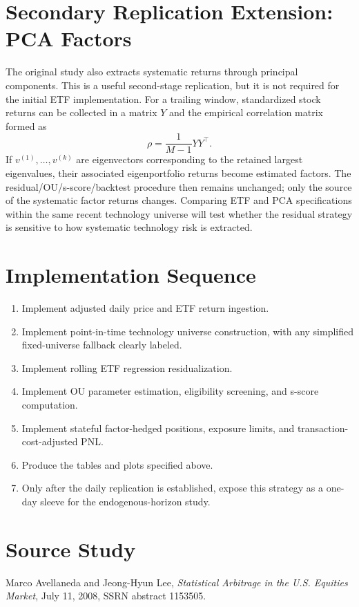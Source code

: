 \documentclass[11pt]{article}
\begin{document}
\section{Secondary Replication Extension: PCA Factors}

The original study also extracts systematic returns through principal
components. This is a useful second-stage replication, but it is not required
for the initial ETF implementation. For a trailing window, standardized stock
returns can be collected in a matrix $Y$ and the empirical correlation matrix
formed as
\[
    \rho = \frac{1}{M-1}YY^{\top}.
\]
If $v^{(1)},\ldots,v^{(k)}$ are eigenvectors corresponding to the retained
largest eigenvalues, their associated eigenportfolio returns become estimated
factors. The residual/OU/s-score/backtest procedure then remains unchanged;
only the source of the systematic factor returns changes. Comparing ETF and
PCA specifications within the same recent technology universe will test
whether the residual strategy is sensitive to how systematic technology risk
is extracted.

\section{Implementation Sequence}

\begin{enumerate}
    \item Implement adjusted daily price and ETF return ingestion.
    \item Implement point-in-time technology universe construction, with any
    simplified fixed-universe fallback clearly labeled.
    \item Implement rolling ETF regression residualization.
    \item Implement OU parameter estimation, eligibility screening, and
    s-score computation.
    \item Implement stateful factor-hedged positions, exposure limits, and
    transaction-cost-adjusted PNL.
    \item Produce the tables and plots specified above.
    \item Only after the daily replication is established, expose this strategy
    as a one-day sleeve for the endogenous-horizon study.
\end{enumerate}

\section*{Source Study}

Marco Avellaneda and Jeong-Hyun Lee,
\emph{Statistical Arbitrage in the U.S. Equities Market}, July 11, 2008,
SSRN abstract 1153505. 
\end{document}
